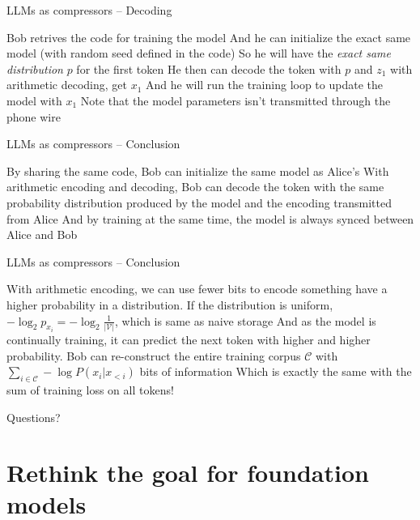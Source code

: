 \documentclass[scheme=plain]{ctexbeamer}
\begin{document}
\begin{frame}{LLMs as compressors -- Decoding}
  \begin{outline}
    \1 Bob retrives the code for training the model
    \pause
    \1 And he can initialize the exact same model (with random seed defined in the code)
    \pause
    \1 So he will have the \emph{exact same distribution} $p$ for the first token
      \2 He then can decode the token with $p$ and $z_1$ with arithmetic decoding, get $x_1$
      \pause
    \1 And he will run the training loop to update the model with $x_1$
    \1 Note that the model parameters isn't transmitted through the phone wire
  \end{outline}
\end{frame}

\begin{frame}{LLMs as compressors -- Conclusion}
  \begin{outline}
    \1 By sharing the same code, Bob can initialize the same model as Alice's
    \1 With arithmetic encoding and decoding, Bob can decode the token with the same probability distribution produced by the model and the encoding transmitted from Alice
    \1 And by training at the same time, the model is always synced between Alice and Bob
  \end{outline}
\end{frame}

\begin{frame}{LLMs as compressors -- Conclusion}
  \begin{outline}
    \1 With arithmetic encoding, we can use fewer bits to encode something have a higher probability in a distribution.
      \2 If the distribution is uniform, $-\log_2 p_{x_i} = -\log_2 \frac{1}{|\mathcal{V}|}$, which is same as naive storage
      \2 And as the model is continually training, it can predict the next token with higher and higher probability.
    \1 Bob can re-construct the entire training corpus $\mathcal{C}$ with $\sum_{i \in \mathcal{C}} - \log P(x_i | x_{<i}) $ bits of information
      \2 Which is exactly the same with the sum of training loss on all tokens!
  \end{outline}
\end{frame}

\begin{frame}[standout]
  Questions?
\end{frame}

\section[LLM, compression and AGI]{Rethink the goal for foundation models}
\end{document}
